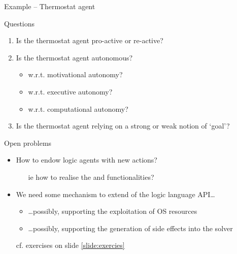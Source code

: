 \documentclass[presentation]{beamer}\mode<presentation>{\usetheme{AMSBolognaFC}}
\begin{document}
\begin{frame}[allowframebreaks]{Example -- Thermostat agent}
    \begin{block}{Questions}
        \begin{enumerate}
            \item Is the thermostat agent \alert{pro-active} or \alert{re-active}?
            
            \item Is the thermostat agent \alert{autonomous}?
            \begin{itemize}
                \item w.r.t. \alert{motivational} autonomy?
                \item w.r.t. \alert{executive} autonomy?
                \item w.r.t. \alert{computational} autonomy?
            \end{itemize}

            \item Is the thermostat agent relying on a \alert{strong} or \alert{weak} notion of `goal'?
        \end{enumerate}
    \end{block}

    \framebreak

    \begin{block}{Open problems}
        \begin{itemize}
            \item How to endow logic agents with new \alert{actions}?
            \begin{itemize}
                \item[ie] how to realise the \alert{} and \alert{} functionalities?
            \end{itemize}

            \medskip

            \item We need some mechanism to extend of the logic language API\ldots
            \begin{itemize}
                \item \ldots possibly, supporting the exploitation of OS resources
    
                \item \ldots possibly, supporting the generation of side effects into the solver
            \end{itemize}
        \end{itemize}
    \end{block}
    \begin{itemize}
        \item[cf.] exercises on slide \ref{slide:exercies} 
    \end{itemize}
\end{frame}
\end{document}

